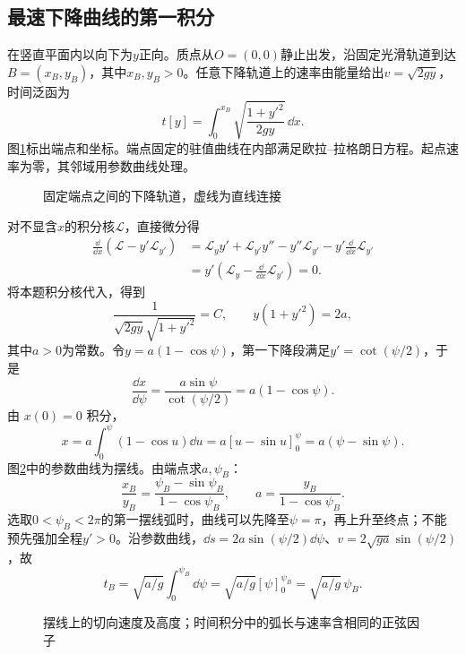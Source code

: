 \subsection{最速下降曲线的第一积分}
\label{sec:complete2-variation}
在竖直平面内以向下为$y$正向。质点从$O=(0,0)$静止出发，沿固定光滑轨道到达$B=(x_B,y_B)$，其中$x_B,y_B>0$。任意下降轨道上的速率由能量给出$v=\sqrt{2gy}$，时间泛函为
\[
 t[y]=\int_0^{x_B}\sqrt{\frac{1+y'^2}{2gy}}\,\dd x.
\]
图\ref{fig:hw2-variation}标出端点和坐标。端点固定的驻值曲线在内部满足欧拉--拉格朗日方程。起点速率为零，其邻域用参数曲线处理。
\begin{figure}[H]\centering
{}
\caption{固定端点之间的下降轨道，虚线为直线连接}\label{fig:hw2-variation}
\end{figure}
对不显含$x$的积分核$\mathcal L$，直接微分得
\[
 \begin{aligned}
 \frac\dd{\dd x}(\mathcal L-y'\mathcal L_{y'})
 &=\mathcal L_y y'+\mathcal L_{y'}y''-y''\mathcal L_{y'}
 -y'\frac\dd{\dd x}\mathcal L_{y'}\\
 &=y'\left(\mathcal L_y-\frac\dd{\dd x}\mathcal L_{y'}\right)=0.
 \end{aligned}
\]
将本题积分核代入，得到
\[
 \frac1{\sqrt{2gy}\sqrt{1+y'^2}}=C,
 \qquad y(1+y'^2)=2a,
\]
其中$a>0$为常数。令$y=a(1-\cos\psi)$，第一下降段满足$y'=\cot(\psi/2)$，于是
\[
 \frac{\dd x}{\dd\psi}
 =\frac{a\sin\psi}{\cot(\psi/2)}=a(1-\cos\psi).
\]
由 $x(0)=0$ 积分，
\[
x=a\int_0^\psi(1-\cos u)\dd u
=a[u-\sin u]_0^\psi=a(\psi-\sin\psi).
\]
图\ref{fig:complete2-cycloid}中的参数曲线为摆线。由端点求$a,\psi_B$：
\[
 \frac{x_B}{y_B}=\frac{\psi_B-\sin\psi_B}{1-\cos\psi_B},\qquad
 a=\frac{y_B}{1-\cos\psi_B}.
\]
选取$0<\psi_B<2\pi$的第一摆线弧时，曲线可以先降至$\psi=\pi$，再上升至终点；不能预先强加全程$y'>0$。沿参数曲线，$\dd s=2a\sin(\psi/2)\dd\psi$、$v=2\sqrt{ga}\sin(\psi/2)$，故
\[
 t_B=\sqrt{a/g}\int_0^{\psi_B}\dd\psi
 =\sqrt{a/g}[\psi]_0^{\psi_B}=\sqrt{a/g}\,\psi_B.
\]
\begin{figure}[H]\centering
{}
\caption{摆线上的切向速度及高度；时间积分中的弧长与速率含相同的正弦因子}\label{fig:complete2-cycloid}
\end{figure}

